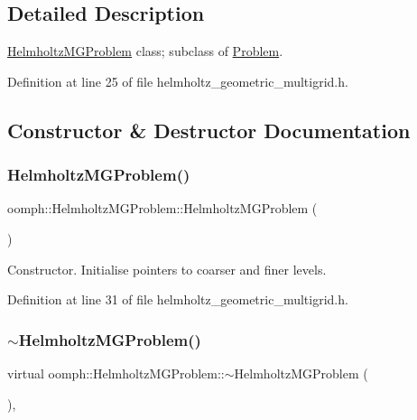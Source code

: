 \subsection{Detailed Description}
\hyperlink{classoomph_1_1HelmholtzMGProblem}{Helmholtz\+M\+G\+Problem} class; subclass of \hyperlink{classoomph_1_1Problem}{Problem}. 

Definition at line 25 of file helmholtz\+\_\+geometric\+\_\+multigrid.\+h.



\subsection{Constructor \& Destructor Documentation}
\mbox{\label{classoomph_1_1HelmholtzMGProblem_ab74fba72dcdfc8f448a992944764cd4c}} 
\subsubsection{\texorpdfstring{Helmholtz\+M\+G\+Problem()}{HelmholtzMGProblem()}}
{\footnotesize\ttfamily oomph\+::\+Helmholtz\+M\+G\+Problem\+::\+Helmholtz\+M\+G\+Problem (\begin{DoxyParamCaption}{ }\end{DoxyParamCaption})\hspace{0.3cm}{\ttfamily [inline]}}



Constructor. Initialise pointers to coarser and finer levels. 



Definition at line 31 of file helmholtz\+\_\+geometric\+\_\+multigrid.\+h.

\mbox{\label{classoomph_1_1HelmholtzMGProblem_a0cc940bfc51d6e95e420b60938640e54}} 
\subsubsection{\texorpdfstring{$\sim$\+Helmholtz\+M\+G\+Problem()}{~HelmholtzMGProblem()}}
{\footnotesize\ttfamily virtual oomph\+::\+Helmholtz\+M\+G\+Problem\+::$\sim$\+Helmholtz\+M\+G\+Problem (\begin{DoxyParamCaption}{ }\end{DoxyParamCaption})\hspace{0.3cm}{\ttfamily [inline]}, {\ttfamily [virtual]}}




